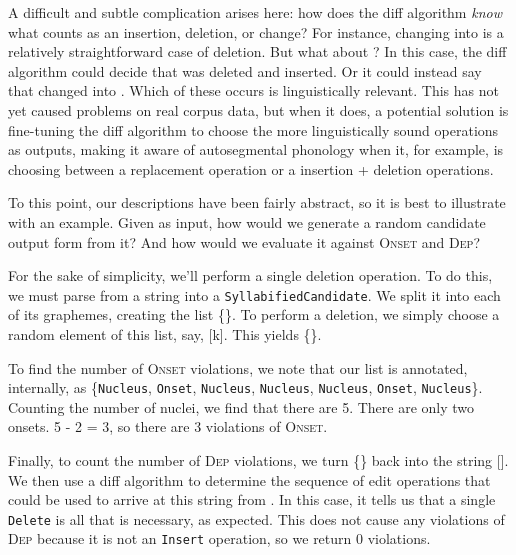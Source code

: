 \documentclass[12pt]{article}
\newcommand{\dep}{\textsc{Dep}}
\newcommand{\onset}{\textsc{Onset}}
\begin{document}
A difficult and subtle complication arises here: how does the diff
algorithm \textit{know} what counts as an insertion, deletion, or change?
For instance, changing  into
\textipa{[ow\'ok\'ow\'o]} is a relatively straightforward case of
deletion. But what about \textipa{[ow\'ak\'iow\'o]}? In this case, the
diff algorithm could decide that \textipa{[\'o]} was deleted and
\textipa{[\'a]} inserted. Or it could instead say that \textipa{[\'o]}
changed into \textipa{[\'a]}. Which of these occurs is linguistically
relevant. This has not yet caused problems on real corpus data, but
when it does, a potential solution is fine-tuning the diff algorithm
to choose the more linguistically sound operations as outputs, making
it aware of autosegmental phonology when it, for example, is choosing
between a replacement operation or a insertion + deletion operations.

To this point, our descriptions have been fairly abstract, so it is best
to illustrate with an example. Given  as
input, how would we generate a random candidate output form from it?
And how would we evaluate it against \onset{} and \dep?

For the sake of simplicity, we'll perform a single deletion operation.
To do this, we must parse  from a string
into a \texttt{SyllabifiedCandidate}. We split it into each of its
graphemes, creating the list \{\}. To
perform a deletion, we simply choose a random element of this list,
say, [k]. This yields \{\}.

To find the number of \onset{} violations, we note that our list is
annotated, internally, as \{\texttt{Nucleus}, \texttt{Onset},
\texttt{Nucleus}, \texttt{Nucleus}, \texttt{Nucleus}, \texttt{Onset},
\texttt{Nucleus}\}. Counting the number of nuclei, we find that there
are 5. There are only two onsets. 5 - 2 = 3, so there are 3
violations of \onset.

Finally, to count the number of \dep{} violations, we turn
\{\} back into the string
[]. We then use a diff algorithm to determine
the sequence of edit operations that could be used to arrive at this
string from . In this case, it tells us
that a single \texttt{Delete} is all that is necessary, as expected.
This does not cause any violations of \dep{} because it is not an
\texttt{Insert} operation, so we return 0 violations.
\end{document}
